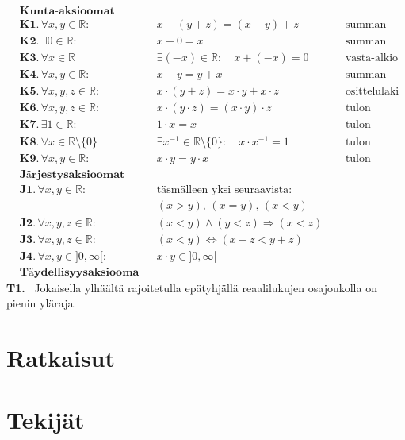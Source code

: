 \begin{align*}
&\textbf{Kunta-aksioomat} \\
&\textbf{K1.} \, \forall x, y \in \mathbb{R}: & &x+(y+z) = (x+y)+z & &| \, \text{summan liitäntälaki} \\
&\textbf{K2.} \, \exists 0 \in \mathbb{R}: & &x+0 = x & &| \, \text{summan neutraalialkio} \\
&\textbf{K3.} \, \forall x \in \mathbb{R} & &\exists (-x) \in \mathbb{R}: \quad x+(-x)=0 & &| \, \text{vasta-alkio} \\
&\textbf{K4.} \, \forall x, y \in \mathbb{R}: & &x+y = y+x & &| \, \text{summan vaihdantalaki} \\
&\textbf{K5.} \, \forall x, y, z \in \mathbb{R}: & &x \cdot (y+z) = x \cdot y + x \cdot z & &| \, \text{osittelulaki} \\
&\textbf{K6.} \, \forall x, y, z \in \mathbb{R}: & &x \cdot (y \cdot z) = (x \cdot y) \cdot z & &| \, \text{tulon liitäntälaki} \\
&\textbf{K7.} \, \exists 1 \in \mathbb{R}: & &1 \cdot x = x & &| \, \text{tulon neutraalialkio} \\
&\textbf{K8.} \, \forall x \in \mathbb{R} \setminus \{0\} & &\exists x^{-1} \in \mathbb{R} \setminus \{0\}: \quad x \cdot x^{-1}=1 & &| \, \text{tulon käänteisalkio} \\
&\textbf{K9.} \, \forall x, y \in \mathbb{R}: & &x \cdot y = y \cdot x & &| \, \text{tulon vaihdantalaki} \\
&\textbf{Järjestysaksioomat} \\
&\textbf{J1.} \, \forall x, y \in \mathbb{R}: & &\text{täsmälleen yksi seuraavista:} & \\
& & &(x > y), \, (x = y), \, (x < y) & \\
&\textbf{J2.} \, \forall x, y, z \in \mathbb{R}: & &(x < y) \land (y < z) \Rightarrow (x < z) & \\
&\textbf{J3.} \, \forall x, y, z \in \mathbb{R}: & &(x < y) \Leftrightarrow (x + z < y + z) & \\
&\textbf{J4.} \, \forall x, y \in ]0,\infty[: & &x \cdot y \in ]0,\infty[ & \\
&\textbf{Täydellisyysaksiooma}
\end{align*}
\textbf{T1.} \, Jokaisella ylhäältä rajoitetulla epätyhjällä reaalilukujen osajoukolla on pienin yläraja.

\chapter{Ratkaisut}


\chapter{Tekijät}
